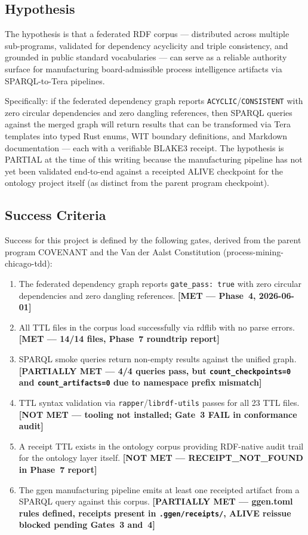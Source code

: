 \subsection{Hypothesis}
\label{sec:research-open-ontologies-hypothesis}

The hypothesis is that a federated RDF corpus --- distributed across multiple sub-programs,
validated for dependency acyclicity and triple consistency, and grounded in public standard
vocabularies --- can serve as a reliable authority surface for manufacturing board-admissible
process intelligence artifacts via SPARQL-to-Tera pipelines.

Specifically: if the federated dependency graph reports \texttt{ACYCLIC}/\texttt{CONSISTENT}
with zero circular dependencies and zero dangling references, then SPARQL queries against the
merged graph will return results that can be transformed via Tera templates into typed Rust
enums, WIT boundary definitions, and Markdown documentation --- each with a verifiable BLAKE3
receipt. The hypothesis is PARTIAL at the time of this writing because the manufacturing
pipeline has not yet been validated end-to-end against a receipted ALIVE checkpoint for the
ontology project itself (as distinct from the parent program checkpoint).

\subsection{Success Criteria}
\label{sec:research-open-ontologies-success}

Success for this project is defined by the following gates, derived from the parent program
COVENANT and the Van der Aalst Constitution (process-mining-chicago-tdd):

\begin{enumerate}
  \item The federated dependency graph reports \texttt{gate\_pass: true} with zero circular
        dependencies and zero dangling references. \textbf{[MET --- Phase~4, 2026-06-01]}
  \item All TTL files in the corpus load successfully via rdflib with no parse errors.
        \textbf{[MET --- 14/14 files, Phase~7 roundtrip report]}
  \item SPARQL smoke queries return non-empty results against the unified graph.
        \textbf{[PARTIALLY MET --- 4/4 queries pass, but \texttt{count\_checkpoints=0} and
        \texttt{count\_artifacts=0} due to namespace prefix mismatch]}
  \item TTL syntax validation via \texttt{rapper}/\texttt{librdf-utils} passes for all 23
        TTL files. \textbf{[NOT MET --- tooling not installed; Gate~3 FAIL in conformance audit]}
  \item A receipt TTL exists in the ontology corpus providing RDF-native audit trail for the
        ontology layer itself. \textbf{[NOT MET --- RECEIPT\_NOT\_FOUND in Phase~7 report]}
  \item The ggen manufacturing pipeline emits at least one receipted artifact from a SPARQL
        query against this corpus. \textbf{[PARTIALLY MET --- ggen.toml rules defined,
        receipts present in \texttt{.ggen/receipts/}, ALIVE reissue blocked pending
        Gates~3 and~4]}
\end{enumerate}

